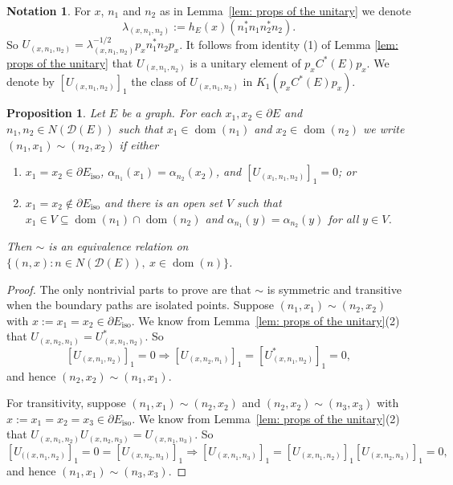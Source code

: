 \documentclass[12pt, a4paper]{amsart}
\numberwithin{equation}{section}
\newtheorem{prop}[thm]{Proposition}
\theoremstyle{definition}
\newtheorem{notation}[thm]{Notation}
\theoremstyle{remark}
\begin{document}
\begin{notation}\label{notation: lambda}
For $x$, $n_1$ and $n_2$ as in Lemma~\ref{lem: props of the unitary} we 
denote 
\[
\lambda_{(x,n_1,n_2)}:=h_E(x)(n_1^*n_1n_2^*n_2).
\]
So $U_{(x,n_1,n_2)}=\lambda_{(x,n_1,n_2)}^{-1/2}p_xn_1^*n_2p_x$. It follows from identity (1) of Lemma \ref{lem: props of the unitary} that $U_{(x,n_1,n_2)}$ is a unitary element of $p_xC^*(E)p_x$. We denote by 
$[U_{(x,n_1,n_2)}]_1$ the class of $U_{(x,n_1,n_2)}$ in 
$K_1(p_xC^*(E)p_x)$.
\end{notation}

\begin{prop}\label{prop: equiv relation}
Let $E$ be a graph. For each $x_1,x_2\in\partial E$ and $n_1,n_2\in 
N(\mathcal{D}(E))$ such that $x_1\in{{\operatorname{dom}}}(n_1)$ and $x_2\in{{\operatorname{dom}}}(n_2)$ we write 
$(n_1,x_1)\sim (n_2,x_2)$ if either
\begin{enumerate}
\item[(a)] $x_1=x_2\in\partial E_{{\operatorname{iso}}}$, 
$\alpha_{n_1}(x_1)=\alpha_{n_2}(x_2)$, and $[U_{(x_1,n_1,n_2)}]_1=0$; or
\item[(b)] $x_1=x_2\notin\partial E_{{\operatorname{iso}}}$ and there is an open set $V$ such 
that $x_1\in 
V\subseteq{{\operatorname{dom}}}(n_1)\cap{{\operatorname{dom}}}(n_2)$ and $\alpha_{n_1}(y)=\alpha_{n_2}(y)$ for 
all $y\in V$. 
\end{enumerate}
Then $\sim$ is an equivalence relation on $\{(n,x):n\in 
N(\mathcal{D}(E)),\ x\in{{\operatorname{dom}}}(n)\}$.
\end{prop}

\begin{proof}
The only nontrivial parts to prove are that $\sim$ is symmetric and transitive 
when the boundary paths are isolated points. Suppose $(n_1,x_1)\sim (n_2,x_2)$ 
with $x:=x_1=x_2\in\partial E_{{\operatorname{iso}}}$. We know from Lemma~\ref{lem: props of the 
unitary}(2) that $U_{(x,n_2,n_1)}=U_{(x,n_1,n_2)}^*$. So
\[
[U_{(x,n_1,n_2)}]_1=0\Longrightarrow 
[U_{(x,n_2,n_1)}]_1=[U_{(x,n_1,n_2)}^*]_1=0,
\]
and hence $(n_2,x_2)\sim (n_1,x_1)$.

For transitivity, suppose $(n_1,x_1)\sim (n_2,x_2)$ and $(n_2,x_2)\sim 
(n_3,x_3)$ with 
$x:=x_1=x_2=x_3\in\partial E_{{\operatorname{iso}}}$. We know from Lemma~\ref{lem: props of the 
unitary}(2) that $U_{(x,n_1,n_2)}U_{(x,n_2,n_3)}=U_{(x,n_1,n_3)}$. So
\[
[U_{((x,n_1,n_2)}]_1=0=[U_{(x,n_2,n_3)}]_1\Longrightarrow 
[U_{(x,n_1,n_3)}]_1=[U_{(x,n_1,n_2)}]_1[U_{(x,n_2,n_3)}]_1=0,
\]
and hence $(n_1,x_1)\sim (n_3,x_3)$.
\end{proof}
\end{document}
